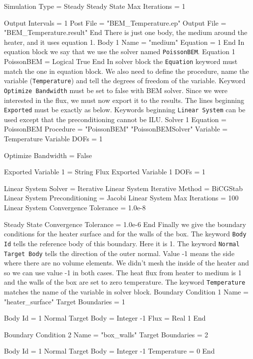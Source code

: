   Simulation Type = Steady
  Steady State Max Iterations = 1

  Output Intervals = 1
  Post File = "BEM_Temperature.ep"
  Output File = "BEM_Temperature.result"
End
\ttend
There is just one body, the medium around the heater, and it uses equation 1.
\ttbegin
Body 1
  Name = "medium"
  Equation = 1
End
\ttend
In equation block we say that we use the solver named {\tt PoissonBEM}.
\ttbegin
Equation 1
  PoissonBEM = Logical True
End
\ttend
In solver block the {\tt Equation} keyword must match the one in equation block.
We also need to define the procedure, name the variable ({\tt Temperature}) and tell 
the degrees of freedom of the variable. Keyword {\tt Optimize Bandwidth} must be set to false
with BEM solver. Since we were interested in the flux, we must now export it to the
results. The lines beginning {\tt Exported} must be exactly as below. Keywords beginning
{\tt Linear System} can be used except that the preconditioning cannot be ILU.
\ttbegin
Solver 1
  Equation = PoissonBEM
  Procedure = "PoissonBEM" "PoissonBEMSolver"
  Variable = Temperature
  Variable DOFs = 1

  Optimize Bandwidth = False

  Exported Variable 1 = String Flux
  Exported Variable 1 DOFs = 1

  Linear System Solver = Iterative
  Linear System Iterative Method = BiCGStab
  Linear System Preconditioning = Jacobi
  Linear System Max Iterations = 100
  Linear System Convergence Tolerance = 1.0e-8

  Steady State Convergence Tolerance = 1.0e-6
End
\ttend
Finally we give the boundary conditions for the heater surface and for the walls of the 
box. The keyword {\tt Body Id} tells the reference body of this boundary. Here it is 1. 
The keyword {\tt Normal Target Body} tells the direction of the outer normal. Value -1 
means the side where there are no volume elements. We didn't mesh the inside of 
the heater and so we can use value -1 in both cases. The heat flux from heater to
medium is 1 and the walls of the box are set to zero temperature. The keyword
{\tt Temperature} matches the name of the variable in solver block.
\ttbegin
Boundary Condition 1
  Name = "heater_surface"
  Target Boundaries = 1

  Body Id = 1
  Normal Target Body = Integer -1
  Flux = Real 1
End

Boundary Condition 2
  Name = "box_walls"
  Target Boundaries = 2

  Body Id = 1
  Normal Target Body = Integer -1
  Temperature = 0
End
\ttend
